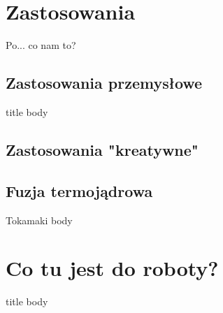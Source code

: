 \documentclass{beamer}
\begin{document}
\section{Zastosowania}
\begin{frame}[t]{Po... co nam to?}
\end{frame}

\subsection{Zastosowania przemysłowe}
\begin{frame}[t]{title}
  body
\end{frame}
\subsection{Zastosowania "kreatywne"}

\subsection{Fuzja termojądrowa}
\begin{frame}[t]{Tokamaki}
  body
\end{frame}



\section{Co tu jest do roboty?}
\begin{frame}[t]{title}
  body
\end{frame}
\end{document}
